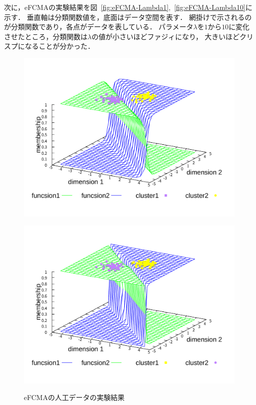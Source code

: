 \documentclass[a4j,12pt,dvipdfmx,oneside]{jsbook}
\theoremstyle{definition}
\begin{document}
  次に，eFCMAの実験結果を図~\ref{fig:eFCMA-Lambda1},~\ref{fig:eFCMA-Lambda10}に示す．
  垂直軸は分類関数値を，底面はデータ空間を表す．
  網掛けで示されるのが分類関数であり，各点がデータを表している．
  パラメータ$\lambda$を$1$から$10$に変化させたところ，分類関数は$\lambda$の値が小さいほどファジィになり，
  大きいほどクリスプになることが分かった．

  \begin{figure}[p]
   \centering
   \begin{minipage}{0.43\hsize}
    \includegraphics[width=\linewidth]{eFCMA-Lambda1.pdf}
    \label{fig:eFCMA-Lambda1}
   \end{minipage}
   \begin{minipage}{0.43\hsize}
    \includegraphics[width=\linewidth]{eFCMA-Lambda10.pdf}
    \label{fig:eFCMA-Lambda10}
   \end{minipage}
   \vspace*{0.5cm}
   \caption{eFCMAの人工データの実験結果}
   \label{fig:eFCMA}
  \end{figure}
  
\end{document}
